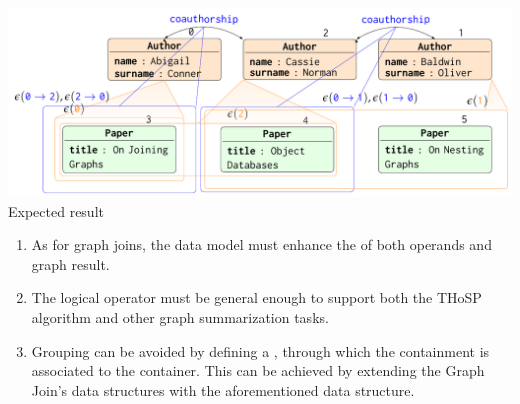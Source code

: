 


\begin{lucido}
\begin{center}
	\includegraphics[width=.9\textwidth]{../images/nesting/patterns/042nested.pdf}\\
	Expected result
\end{center}
\end{lucido}

\begin{lucido}
\begin{enumerate}[<+->]
	[circle]
	\item As for graph joins, the data model must enhance the  of both operands and graph result.
	
	\item The logical  operator must be general enough to support both the THoSP algorithm and other graph summarization tasks.
	
	\item Grouping can be avoided by defining a , through which the containment is associated to the container. This can be achieved by extending the Graph Join's data structures with the aforementioned data structure.
	
\end{enumerate}
\end{lucido}

